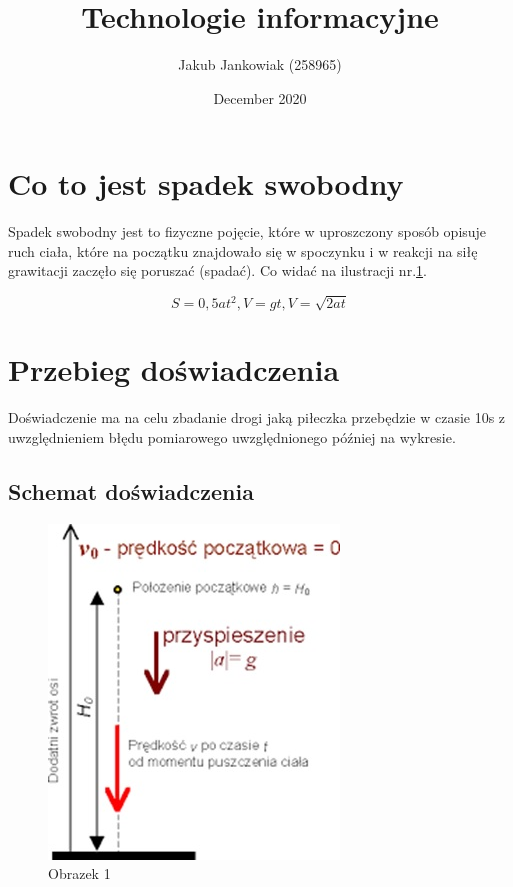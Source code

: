 \documentclass{article}
\title{Technologie informacyjne}
\author{Jakub Jankowiak (258965) }
\date{December 2020}
\begin{document}
\maketitle
\tableofcontents
\clearpage
\section{Co to jest spadek swobodny}
Spadek swobodny jest to fizyczne pojęcie, które w uproszczony sposób opisuje ruch ciała, które na początku znajdowało się w spoczynku i w reakcji na siłę grawitacji zaczęło się poruszać (spadać). Co widać na ilustracji nr.\ref{fig: Obrazek 1}.

\begin{equation}
S=0,5at^2  ,  V=gt , V=\sqrt{2at}
\end{equation}

\section{Przebieg doświadczenia}
Doświadczenie ma na celu zbadanie drogi jaką piłeczka przebędzie w czasie 10s z uwzględnieniem błędu pomiarowego uwzględnionego później na wykresie.
\subsection{Schemat doświadczenia}
\begin{figure}[h]
	\centering
	\includegraphics[scale=1.2]{1.1.jpg}
	\caption{Obrazek 1}
	\label{fig: Obrazek 1}
\end{figure}


\newpage
\end{document}
